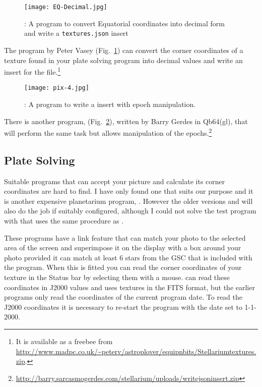 \begin{figure}[htb]
\centering\texttt{[image: EQ-Decimal.jpg]}
\caption{: A program to convert Equatorial coordinates into decimal
form and write a \texttt{textures.json} insert}
\label{fig:dso:STGen}
\end{figure}

The program  by Peter Vasey (Fig.~\ref{fig:dso:STGen}) can convert the corner coordinates of a
texture found in your plate solving program into decimal values and write an
insert for the  file.\footnote{It is available as a freebee
from
\url{http://www.madpc.co.uk/~peterv/astroplover/equipnbits/Stellariumtextures.zip}.}

\begin{figure}[ht]
\centering\texttt{[image: pix-4.jpg]}
\caption{: A program to write a  insert with epoch manipulation.}
\label{fig:dso:ReadDSS}
\end{figure}

There is another program,  (Fig.~\ref{fig:dso:ReadDSS}), written by Barry Gerdes in Qb64(gl), that will perform the same
task but allows manipulation of the epochs.\footnote{
\url{http://barry.sarcasmogerdes.com/stellarium/uploads/writejsoninsert.zip}}

\subsection{Plate Solving}%
\label{sec:dso:plateSolving}

Suitable programs that can accept your picture and calculate its corner
coordinates are hard to find. I have only found one that suits our
purpose and it is another expensive planetarium program, .
However the older versions  and  will also do the job if
suitably configured, although I could not solve the test program with 
 that uses the same procedure as .

These programs have a link feature that can match your photo to the
selected area of the screen and superimpose it on the display with a box
around your photo provided it can match at least 6 stars from the GSC
that is included with the program. When this is fitted you can read the
corner coordinates of your texture in the Status bar by selecting them
with a mouse.  can read these coordinates in J2000 values and
uses textures in the FITS format, but the earlier programs only read the
coordinates of the current program date. To read the J2000 coordinates
it is necessary to re-start the program with the date set to 1-1-2000.


